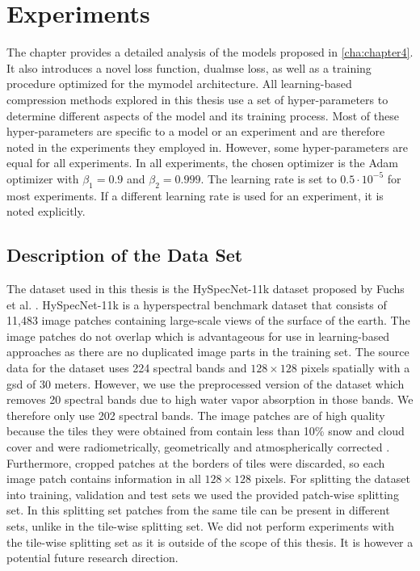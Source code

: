 \chapter{Experiments\label{cha:chapter5}}
The chapter provides a detailed analysis of the models proposed in \autoref{cha:chapter4}. It also introduces a novel loss function, \ac{dualmse} loss, as well as a training procedure optimized for the \ac{mymodel} architecture. All learning-based compression methods explored in this thesis use a set of hyper-parameters to determine different aspects of the model and its training process. Most of these hyper-parameters are specific to a model or an experiment and are therefore noted in the experiments they employed in. However, some hyper-parameters are equal for all experiments. In all experiments, the chosen optimizer is the Adam optimizer with $\beta_1=0.9$ and $\beta_2=0.999$. The learning rate is set to $0.5 \cdot 10^{-5}$ for most experiments. If a different learning rate is used for an experiment, it is noted explicitly.

\section{Description of the Data Set\label{sec:dataset}}
The dataset used in this thesis is the HySpecNet-11k dataset proposed by Fuchs et al. \citep{fuchs_hyspecnet-11k_2023}. HySpecNet-11k is a hyperspectral benchmark dataset that consists of 11,483 image patches containing large-scale views of the surface of the earth. The image patches do not overlap which is advantageous for use in learning-based approaches as there are no duplicated image parts in the training set. The source data for the dataset uses 224 spectral bands and $128\times 128$ pixels spatially with a \ac{gsd} of 30 meters. However, we use the preprocessed version of the dataset which removes 20 spectral bands due to high water vapor absorption in those bands. We therefore only use 202 spectral bands. The image patches are of high quality because the tiles they were obtained from contain less than 10\% snow and cloud cover and were radiometrically, geometrically and atmospherically corrected \citep{fuchs_hyspecnet-11k_2023}. Furthermore, cropped patches at the borders of tiles were discarded, so each image patch contains information in all $128\times 128$ pixels. For splitting the dataset into training, validation and test sets we used the provided patch-wise splitting set. In this splitting set patches from the same tile can be present in different sets, unlike in the tile-wise splitting set. We did not perform experiments with the tile-wise splitting set as it is outside of the scope of this thesis. It is however a potential future research direction.

